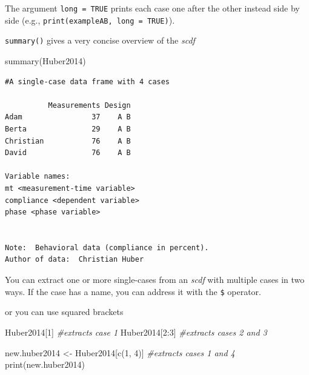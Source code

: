 \documentclass[
]{book}
\newenvironment{Shaded}{\begin{snugshade}}{\end{snugshade}}
\newcommand{\CommentTok}[1]{\textcolor[rgb]{0.56,0.35,0.01}{\textit{#1}}}
\newcommand{\DecValTok}[1]{\textcolor[rgb]{0.00,0.00,0.81}{#1}}
\newcommand{\FunctionTok}[1]{\textcolor[rgb]{0.00,0.00,0.00}{#1}}
\newcommand{\NormalTok}[1]{#1}
\newcommand{\OtherTok}[1]{\textcolor[rgb]{0.56,0.35,0.01}{#1}}
\newcommand{\SpecialCharTok}[1]{\textcolor[rgb]{0.00,0.00,0.00}{#1}}
\begin{document}
The argument \texttt{long\ =\ TRUE} prints each case one after the other instead side by side (e.g., \texttt{print(exampleAB,\ long\ =\ TRUE)}).

\texttt{summary()} gives a very concise overview of the \emph{scdf}

\begin{Shaded}
\begin{Highlighting}[]
\FunctionTok{summary}\NormalTok{(Huber2014)}
\end{Highlighting}
\end{Shaded}

\begin{verbatim}
#A single-case data frame with 4 cases

          Measurements Design
Adam                37    A B
Berta               29    A B
Christian           76    A B
David               76    A B

Variable names:
mt <measurement-time variable>
compliance <dependent variable>
phase <phase variable>


Note:  Behavioral data (compliance in percent).
Author of data:  Christian Huber 
\end{verbatim}

You can extract one or more single-cases from an \emph{scdf} with multiple cases in two ways. If the case has a name, you can address it with the \texttt{\$} operator.

\begin{Shaded}
\end{Shaded}

or you can use squared brackets

\begin{Shaded}
\begin{Highlighting}[]
\NormalTok{Huber2014[}\DecValTok{1}\NormalTok{] }\CommentTok{\#extracts case 1}
\NormalTok{Huber2014[}\DecValTok{2}\SpecialCharTok{:}\DecValTok{3}\NormalTok{] }\CommentTok{\#extracts cases 2 and 3}
\end{Highlighting}
\end{Shaded}

\begin{Shaded}
\begin{Highlighting}[]
\NormalTok{new.huber2014 }\OtherTok{\textless{}{-}}\NormalTok{ Huber2014[}\FunctionTok{c}\NormalTok{(}\DecValTok{1}\NormalTok{, }\DecValTok{4}\NormalTok{)] }\CommentTok{\#extracts cases 1 and 4}
\FunctionTok{print}\NormalTok{(new.huber2014)}
\end{Highlighting}
\end{Shaded}
\end{document}
